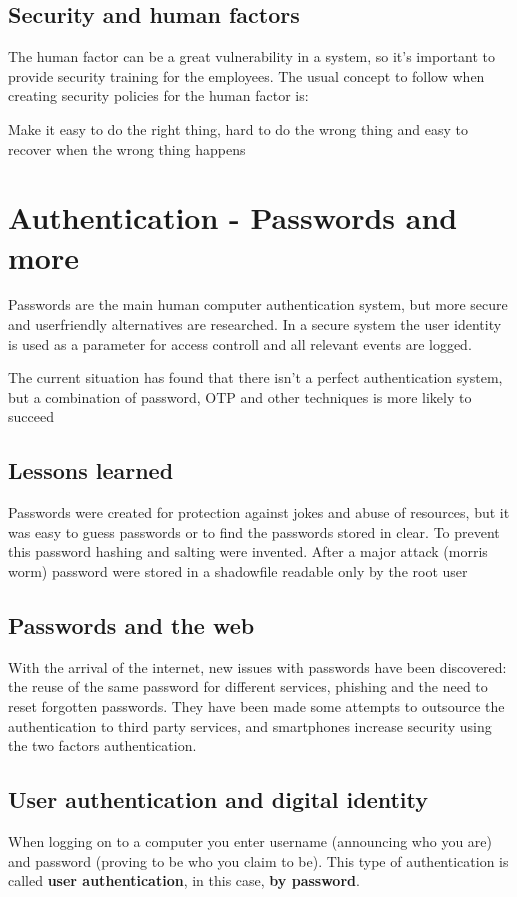 \documentclass[12pt, a4paper]{article}
\begin{document}
\subsection{Security and human factors}
The human factor can be a great vulnerability in a system, so it's important to provide security training for the employees.
The usual concept to follow when creating security policies for the human factor is:
\begin{center}
    Make it easy to do the right thing, hard to do the wrong thing and easy to recover when the wrong thing happens
\end{center}

\newpage
\section{Authentication - Passwords and more}
Passwords are the main human computer authentication system, but more secure and userfriendly alternatives are researched.
In a secure system  the user identity is used as a parameter for access controll and all relevant events are logged.

The current situation has found that there isn't a perfect authentication system, but a combination of password, OTP and other
techniques is more likely to succeed

\subsection{Lessons learned}
Passwords were created for protection against jokes and abuse of resources, but it was easy to guess passwords or to find the 
passwords stored in clear. To prevent this password hashing and salting were invented. After a major attack (morris worm) password
were stored in a shadowfile readable only by the root user

\subsection{Passwords and the web}
With the arrival of the internet, new issues with passwords have been discovered: the reuse of the same password for different 
services, phishing and the need to reset forgotten passwords. They have been made some attempts to outsource the authentication
to third party services, and smartphones increase security using the two factors authentication.

\subsection{User authentication and digital identity}
When logging on to a computer you enter username (announcing who you are) and password (proving to be who you claim to be). This
type of authentication is called \textbf{user authentication}, in this case, \textbf{by password}.
\end{document}
